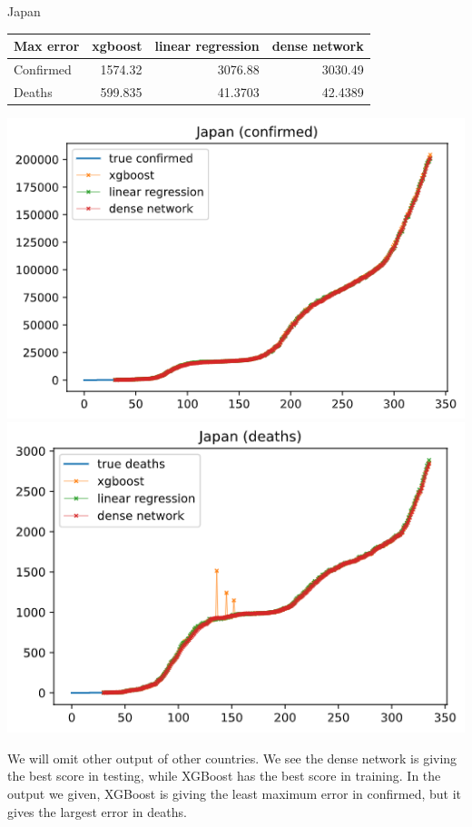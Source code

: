 \documentclass[a4paper,12pt]{article}
\begin{document}
\begin{tcolorbox}
    Japan

    \begin{tabular}{lrrr}
    \toprule
     Max error   &   xgboost &   linear regression &   dense network \\
    \midrule
     Confirmed   &  1574.32  &           3076.88   &       3030.49   \\
     Deaths      &   599.835 &             41.3703 &         42.4389 \\
    \bottomrule
    \end{tabular}
        
    \begin{center}
        \includegraphics[width=1\textwidth]{Japan_1-1.png}
        \includegraphics[width=\textwidth]{Japan_1-2.png}
    \end{center}

\end{tcolorbox}
We will omit other output of other countries. We see the dense network is giving the best score in testing, while XGBoost has the best score in training. In the output we given, XGBoost is giving the least maximum error in confirmed, but it gives the largest error in deaths.
\end{document}
